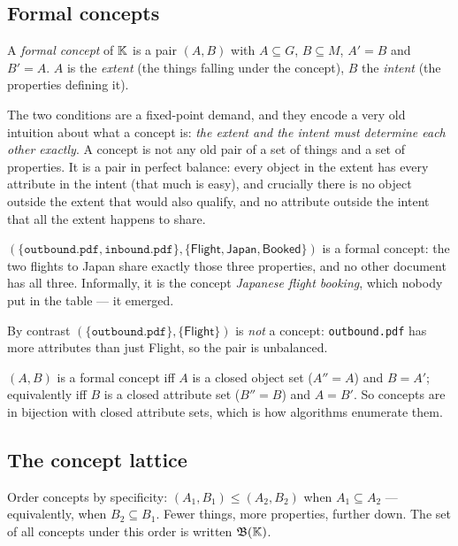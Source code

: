 \subsection{Formal concepts}

\begin{definition}
A \emph{formal concept} of $\mathbb{K}$ is a pair $(A, B)$ with $A \subseteq G$,
$B \subseteq M$, $A' = B$ and $B' = A$. $A$ is the \emph{extent} (the things
falling under the concept), $B$ the \emph{intent} (the properties defining
it).
\end{definition}

The two conditions are a fixed-point demand, and they encode a very old
intuition about what a concept is: \emph{the extent and the intent must
determine each other exactly}. A concept is not any old pair of a set of
things and a set of properties. It is a pair in perfect balance: every object
in the extent has every attribute in the intent (that much is easy), and
crucially there is no object outside the extent that would also qualify, and
no attribute outside the intent that all the extent happens to share.

\begin{example}
$(\{\texttt{outbound.pdf}, \texttt{inbound.pdf}\},
\{\textsf{Flight}, \textsf{Japan}, \textsf{Booked}\})$ is a formal concept: the
two flights to Japan share exactly those three properties, and no other
document has all three. Informally, it is the concept \emph{Japanese flight
booking}, which nobody put in the table --- it emerged.

By contrast $(\{\texttt{outbound.pdf}\}, \{\textsf{Flight}\})$ is \emph{not} a
concept: \texttt{outbound.pdf} has more attributes than just \textsf{Flight},
so the pair is unbalanced.
\end{example}

\begin{proposition}
$(A,B)$ is a formal concept iff $A$ is a closed object set ($A''=A$) and
$B=A'$; equivalently iff $B$ is a closed attribute set ($B''=B$) and $A=B'$.
So concepts are in bijection with closed attribute sets, which is how
algorithms enumerate them.
\end{proposition}

\subsection{The concept lattice}
\label{sec:basic-theorem}

Order concepts by specificity: $(A_1, B_1) \leq (A_2, B_2)$ when
$A_1 \subseteq A_2$ --- equivalently, when $B_2 \subseteq B_1$. Fewer things,
more properties, further down. The set of all concepts under this order is
written $\mathfrak{B}(\mathbb{K})$.

